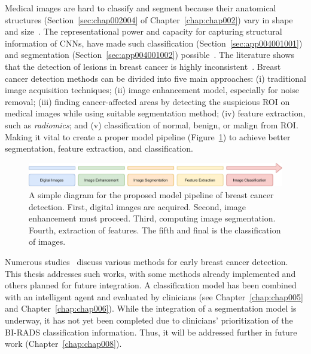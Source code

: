 Medical images are hard to classify and segment because their anatomical structures (Section~\ref{sec:chap002004} of Chapter~\ref{chap:chap002}) vary in shape and size~\cite{10.1007/978-3-030-00934-2_99}.
The representational power and capacity for capturing structural information of \acp{CNN}, have made such classification (Section~\ref{sec:app004001001}) and segmentation (Section~\ref{sec:app004001002}) possible~\cite{Hou_2016_CVPR}.
The literature shows that the detection of lesions in breast cancer is highly inconsistent~\cite{shen2019deep}.
Breast cancer detection methods can be divided into five main approaches:
(i) traditional image acquisition techniques;
(ii) image enhancement model, especially for noise removal;
(iii) finding cancer-affected areas by detecting the suspicious \ac{ROI} on medical images while using suitable segmentation method;
(iv) feature extraction, such as {\it radiomics}; and
(v) classification of normal, benign, or malign from \ac{ROI}.
Making it vital to create a proper model pipeline (Figure~\ref{fig:fig027}) to achieve better segmentation, feature extraction, and classification.

\begin{figure}[htbp]
\centering
\includegraphics[width=\columnwidth]{images/fig027}
\caption{A simple diagram for the proposed model pipeline of breast cancer detection. First, digital images are acquired. Second, image enhancement must proceed. Third, computing image segmentation. Fourth, extraction of features. The fifth and final is the classification of images.}
\label{fig:fig027}
\end{figure}

Numerous studies~\cite{wang2018support, milosevic2017comparison} discuss various methods for early breast cancer detection.
This thesis addresses such works, with some methods already implemented and others planned for future integration.
A classification model has been combined with an intelligent agent and evaluated by clinicians (see Chapter~\ref{chap:chap005} and Chapter~\ref{chap:chap006}).
While the integration of a segmentation model is underway, it has not yet been completed due to clinicians' prioritization of the \ac{BI-RADS} classification information.
Thus, it will be addressed further in future work (Chapter~\ref{chap:chap008}).

